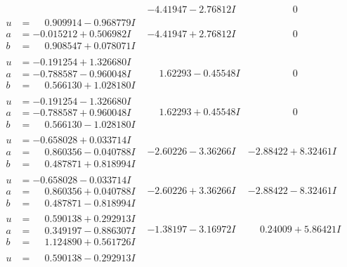 \documentclass[1p]{elsarticle_modified}
\theoremstyle{definition}
\begin{document}
$$\begin{array}{c|c|c}
 & -4.41947 - 2.76812 I & \phantom{-0.000000 } 0 \\ \hline\begin{aligned}
u &= \phantom{-}0.909914 - 0.968779 I \\
a &= -0.015212 + 0.506982 I \\
b &= \phantom{-}0.908547 + 0.078071 I\end{aligned}
 & -4.41947 + 2.76812 I & \phantom{-0.000000 } 0 \\ \hline\begin{aligned}
u &= -0.191254 + 1.326680 I \\
a &= -0.788587 - 0.960048 I \\
b &= \phantom{-}0.566130 + 1.028180 I\end{aligned}
 & \phantom{-}1.62293 - 0.45548 I & \phantom{-0.000000 } 0 \\ \hline\begin{aligned}
u &= -0.191254 - 1.326680 I \\
a &= -0.788587 + 0.960048 I \\
b &= \phantom{-}0.566130 - 1.028180 I\end{aligned}
 & \phantom{-}1.62293 + 0.45548 I & \phantom{-0.000000 } 0 \\ \hline\begin{aligned}
u &= -0.658028 + 0.033714 I \\
a &= \phantom{-}0.860356 - 0.040788 I \\
b &= \phantom{-}0.487871 + 0.818994 I\end{aligned}
 & -2.60226 - 3.36266 I & -2.88422 + 8.32461 I \\ \hline\begin{aligned}
u &= -0.658028 - 0.033714 I \\
a &= \phantom{-}0.860356 + 0.040788 I \\
b &= \phantom{-}0.487871 - 0.818994 I\end{aligned}
 & -2.60226 + 3.36266 I & -2.88422 - 8.32461 I \\ \hline\begin{aligned}
u &= \phantom{-}0.590138 + 0.292913 I \\
a &= \phantom{-}0.349197 - 0.886307 I \\
b &= \phantom{-}1.124890 + 0.561726 I\end{aligned}
 & -1.38197 - 3.16972 I & \phantom{-}0.24009 + 5.86421 I \\ \hline\begin{aligned}
u &= \phantom{-}0.590138 - 0.292913 I \\

\end{aligned}
\end{array}$$
\end{document}
